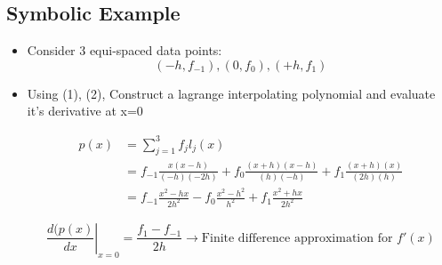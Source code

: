 \subsection{Symbolic Example}
\begin{itemize}
    \item Consider 3 equi-spaced data points:
    \[(-h,f_{-1}), (0,f_0), (+h,f_1)\]

    \item Using (1), (2), Construct a lagrange interpolating polynomial and evaluate it's derivative at x=0

    \begin{equation*}
    \begin{aligned}
        p(x) &= \sum_{j=1}^3 f_j l_j(x)\\
        &= f_{-1}\frac{x(x-h)}{(-h)(-2h)} + f_0 \frac{(x+h)(x-h)}{(h)(-h)} + f_1 \frac{(x+h)(x)}{(2h)(h)}\\
        &= f_{-1} \frac{x^2-hx}{2h^2} - f_0 \frac{x^2-h^2}{h^2} + f_1 \frac{x^2+hx}{2h^2}
    \end{aligned}
    \end{equation*}

    \begin{equation*}
        \left. \frac{d(p(x)}{dx} \right\vert_{x=0} = \frac{f_1-f_{-1}}{2h} \rightarrow \text{Finite difference approximation for } f'(x)
    \end{equation*}
    
\end{itemize}
